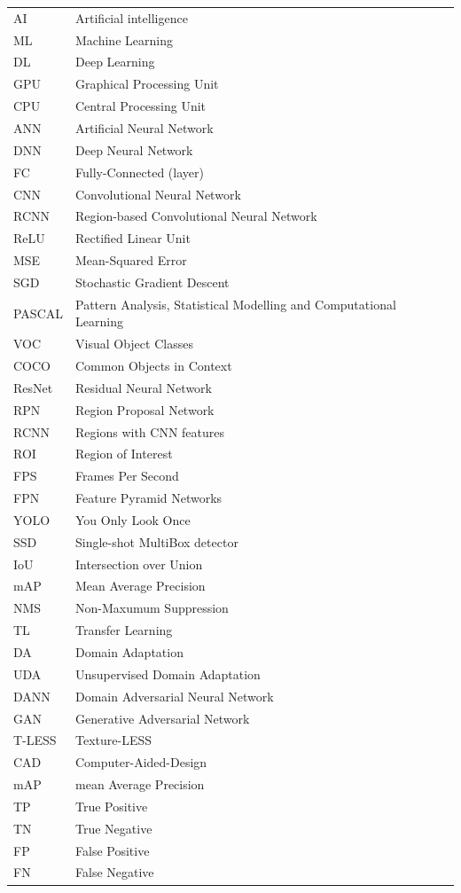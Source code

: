 \documentclass[english, 12pt, a4paper, elec, utf8, a-1b, online]{aaltothesis}
\begin{document}
\begin{tabular}{ll}
AI         & Artificial intelligence\\
ML         & Machine Learning\\
DL         & Deep Learning\\
GPU        & Graphical Processing Unit\\
CPU        & Central Processing Unit\\
ANN        & Artificial Neural Network\\
DNN        & Deep Neural Network\\
FC         & Fully-Connected (layer)\\
CNN        & Convolutional Neural Network\\
RCNN       & Region-based Convolutional Neural Network\\
ReLU       & Rectified Linear Unit\\
MSE        & Mean-Squared Error\\
SGD        & Stochastic Gradient Descent\\
PASCAL		& Pattern Analysis, Statistical Modelling and Computational Learning\\
VOC	 		& Visual Object Classes\\
COCO		& Common Objects in Context\\
ResNet		&Residual Neural Network\\
RPN			&Region Proposal Network\\
RCNN		&Regions with CNN features\\
ROI			&Region of Interest\\
FPS			&Frames Per Second\\
FPN			&Feature Pyramid Networks\\
YOLO		&You Only Look Once \\
SSD			&Single-shot MultiBox detector\\
IoU 		&Intersection over Union\\
mAP			&Mean Average Precision\\
NMS			&Non-Maxumum Suppression\\
TL			&Transfer Learning\\
DA			&Domain Adaptation\\
UDA			&Unsupervised Domain Adaptation\\
DANN		&Domain Adversarial Neural Network  \\
GAN			&Generative Adversarial Network\\
T-LESS		&Texture-LESS\\
CAD 		&Computer-Aided-Design\\
mAP			&mean Average Precision\\
TP			&True Positive\\
TN			&True Negative\\
FP			&False Positive\\
FN			&False Negative\\
\end{tabular}
\end{document}
